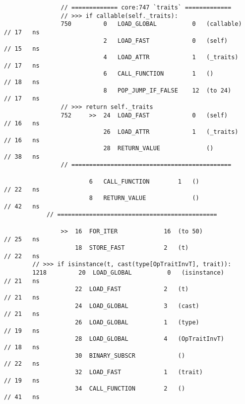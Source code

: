 \begin{code}
\begin{verbatim}
                // ============= core:747 `traits` =============
                // >>> if callable(self._traits):
                750         0   LOAD_GLOBAL          0   (callable)                                 // 17   ns
                            2   LOAD_FAST            0   (self)                                     // 15   ns
                            4   LOAD_ATTR            1   (_traits)                                  // 17   ns
                            6   CALL_FUNCTION        1   ()                                         // 18   ns
                            8   POP_JUMP_IF_FALSE    12  (to 24)                                    // 17   ns
                // >>> return self._traits
                752     >>  24  LOAD_FAST            0   (self)                                     // 16   ns
                            26  LOAD_ATTR            1   (_traits)                                  // 16   ns
                            28  RETURN_VALUE             ()                                         // 38   ns
                // =============================================

                        6   CALL_FUNCTION        1   ()                                             // 22   ns
                        8   RETURN_VALUE             ()                                             // 42   ns
            // =============================================

                >>  16  FOR_ITER             16  (to 50)                                            // 25   ns
                    18  STORE_FAST           2   (t)                                                // 22   ns
        // >>> if isinstance(t, cast(type[OpTraitInvT], trait)):
        1218         20  LOAD_GLOBAL          0   (isinstance)                                      // 21   ns
                    22  LOAD_FAST            2   (t)                                                // 21   ns
                    24  LOAD_GLOBAL          3   (cast)                                             // 21   ns
                    26  LOAD_GLOBAL          1   (type)                                             // 19   ns
                    28  LOAD_GLOBAL          4   (OpTraitInvT)                                      // 18   ns
                    30  BINARY_SUBSCR            ()                                                 // 22   ns
                    32  LOAD_FAST            1   (trait)                                            // 19   ns
                    34  CALL_FUNCTION        2   ()                                                 // 41   ns


\end{verbatim}
\end{code}
